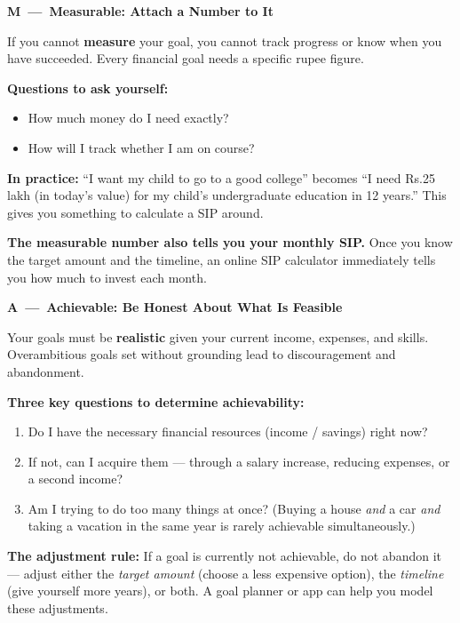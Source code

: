 \documentclass[12pt,a4paper]{article}
\makeatletter
\newcommand{\rupee}{\ifmmode\text{Rs.}\else Rs.\@\fi}
\newcommand{\smartheading}[4]{%
  \begingroup
  \setlength{\fboxsep}{4pt}%
  \noindent\colorbox{#1}{%
    \parbox{\dimexpr\linewidth-2\fboxsep\relax}{%
      \Large\bfseries\color{#4}#2\ \normalsize\bfseries---\ #3\strut%
    }%
  }%
  \par\endgroup\medskip
}
\makeatother
\begin{document}
\begin{tcolorbox}[base, colback=AccentTeal!8, colframe=AccentTeal]
\smartheading{AccentTeal}{M}{Measurable: Attach a Number to It}{white}

If you cannot \textbf{measure} your goal, you cannot track progress or know when you have succeeded. Every financial goal needs a specific rupee figure.

\medskip
\textbf{Questions to ask yourself:}
\begin{itemize}
  \item How much money do I need exactly?
  \item How will I track whether I am on course?
\end{itemize}

\medskip
\textbf{In practice:} ``I want my child to go to a good college'' becomes ``I need \rupee{}25 lakh (in today's value) for my child's undergraduate education in 12 years.'' This gives you something to calculate a SIP around.

\medskip
\textbf{The measurable number also tells you your monthly SIP.} Once you know the target amount and the timeline, an online SIP calculator immediately tells you how much to invest each month.
\end{tcolorbox}

\vspace{3mm}

\begin{tcolorbox}[base, colback=AccentGold!15, colframe=AccentGold]
\smartheading{AccentGold}{A}{Achievable: Be Honest About What Is Feasible}{DarkGray}

Your goals must be \textbf{realistic} given your current income, expenses, and skills. Overambitious goals set without grounding lead to discouragement and abandonment.

\medskip
\textbf{Three key questions to determine achievability:}
\begin{enumerate}
  \item Do I have the necessary financial resources (income / savings) right now?
  \item If not, can I acquire them --- through a salary increase, reducing expenses, or a second income?
  \item Am I trying to do too many things at once? (Buying a house \textit{and} a car \textit{and} taking a vacation in the same year is rarely achievable simultaneously.)
\end{enumerate}

\medskip
\textbf{The adjustment rule:} If a goal is currently not achievable, do not abandon it --- adjust either the \textit{target amount} (choose a less expensive option), the \textit{timeline} (give yourself more years), or both. A goal planner or app can help you model these adjustments.
\end{tcolorbox}
\end{document}
